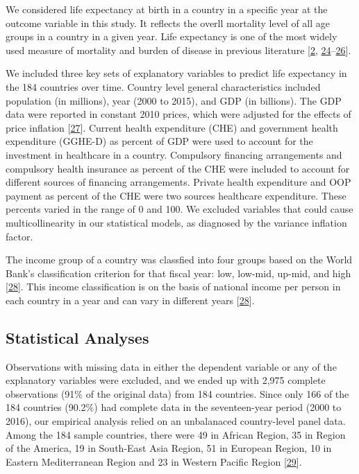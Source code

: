 \documentclass[]{elsarticle} %
\begin{document}
We considered life expectancy at birth in a country in a specific year at the outcome variable in this study.
It reflects the overll mortality level of all age groups in a country in a given year.
Life expectancy is one of the most widely used measure of mortality and burden of disease in previous literature {[}\protect\hyperlink{ref-mathers2015causes}{2}, \protect\hyperlink{ref-lee2012effect}{24}--\protect\hyperlink{ref-bennett2015future}{26}{]}.

We included three key sets of explanatory variables to predict life expectancy in the 184 countries over time.
Country level general characteristics included population (in millions), year (2000 to 2015), and GDP (in billions).
The GDP data were reported in constant 2010 prices, which were adjusted for the effects of price inflation {[}\protect\hyperlink{ref-worldbankconstant}{27}{]}.
Current health expenditure (CHE) and government health expenditure (GGHE-D) as percent of GDP were used to account for the investment in healthcare in a country.
Compulsory financing arrangements and compulsory health insurance as percent of the CHE were included to account for different sources of financing arrangements.
Private health expenditure and OOP payment as percent of the CHE were two sources healthcare expenditure.
These percents varied in the range of 0 and 100.
We excluded variables that could cause multicollinearity in our statistical models, as diagnosed by the variance inflation factor.

The income group of a country was classfied into four groups based on the World Bank's classification criterion for that fiscal year: low, low-mid, up-mid, and high {[}\protect\hyperlink{ref-worldbankincome}{28}{]}. This income classification is on the basis of national income per person in each country in a year and can vary in different years {[}\protect\hyperlink{ref-worldbankincome}{28}{]}.

\hypertarget{statistical-analyses}{%
\subsection{Statistical Analyses}\label{statistical-analyses}}

Observations with missing data in either the dependent variable or any of the explanatory variables were excluded, and we ended up with 2,975 complete observations (91\% of the original data) from 184 countries.
Since only 166 of the 184 countries (90.2\%) had complete data in the seventeen-year period (2000 to 2016), our empirical analysis relied on an unbalanaced country-level panel data.
Among the 184 sample countries, there were 49 in African Region, 35 in Region of the America, 19 in South-East Asia Region, 51 in European Region, 10 in Eastern Mediterranean Region and 23 in Western Pacific Region {[}\protect\hyperlink{ref-WHOregion}{29}{]}.
\end{document}

